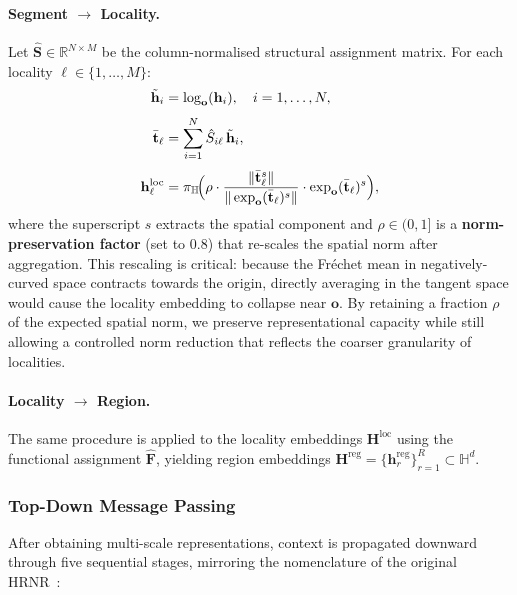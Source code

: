 \paragraph{Segment $\to$ Locality.}
Let $\hat{\mathbf{S}} \in \mathbb{R}^{N \times M}$ be the column-normalised structural assignment matrix.
For each locality $\ell \in \{1, \dots, M\}$:
\begin{align}
  \tilde{\mathbf{h}}_i &= \log_{\mathbf{o}}(\mathbf{h}_i),\quad i = 1, \dots, N, \label{eq:seg_to_tangent}\\[3pt]
  \bar{\mathbf{t}}_\ell &= \sum_{i=1}^{N} \hat{S}_{i\ell}\,\tilde{\mathbf{h}}_i, \label{eq:tangent_mean_loc}\\[3pt]
  \mathbf{h}_\ell^{\text{loc}} &= \pi_{\mathbb{H}}\!\Bigl(
    \rho \cdot \frac{\|\bar{\mathbf{t}}_\ell^s\|}{\|\exp_{\mathbf{o}}(\bar{\mathbf{t}}_\ell)^s\|}
    \cdot \exp_{\mathbf{o}}(\bar{\mathbf{t}}_\ell)^s
  \Bigr), \label{eq:loc_emb}
\end{align}
where the superscript $s$ extracts the spatial component and $\rho \in (0,1]$ is a \textbf{norm-preservation factor} (set to $0.8$) that re-scales the spatial norm after aggregation.
This rescaling is critical:
because the Fréchet mean in negatively-curved space contracts towards the origin, directly averaging in the tangent space would cause the locality embedding to collapse near $\mathbf{o}$.
By retaining a fraction $\rho$ of the expected spatial norm, we preserve representational capacity while still allowing a controlled norm reduction that reflects the coarser granularity of localities.

\paragraph{Locality $\to$ Region.}
The same procedure is applied to the locality embeddings $\mathbf{H}^{\text{loc}}$ using the functional assignment $\hat{\mathbf{F}}$, yielding region embeddings $\mathbf{H}^{\text{reg}} = \{\mathbf{h}_r^{\text{reg}}\}_{r=1}^R \subset \mathbb{H}^d$.

\subsubsection{Top-Down Message Passing}\label{subsubsec:top_down}

After obtaining multi-scale representations, context is propagated downward through five sequential stages,
mirroring the nomenclature of the original HRNR~\cite{hrnr}:


